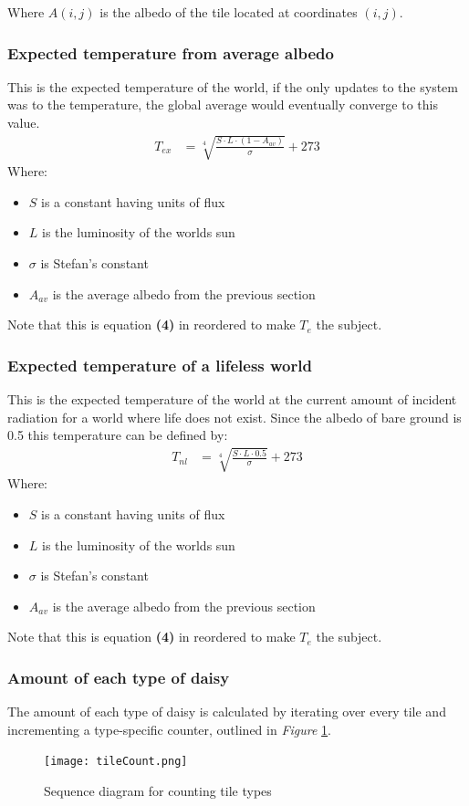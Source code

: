\documentclass[12pt]{article}
\begin{document}
Where $A(i,j)$ is the albedo of the tile located at coordinates
$(i,j)$.

\subsubsection{Expected temperature from average albedo}
This is the expected temperature of the world, if the only updates to
the system was to the temperature, the global average would eventually
converge to this value.
\begin{align}
  T_{ex} &= \sqrt[4]{\frac{S\cdot L \cdot (1-A_{av})}{\sigma}} + 273
\end{align}
Where:
\begin{itemize}
\item $S$ is a constant having units of flux
\item $L$ is the luminosity of the worlds sun
\item $\sigma$ is Stefan's constant
\item $A_{av}$ is the average albedo from the previous section
\end{itemize}

Note that this is equation {\bf (4)} in \cite{watson1983} reordered to
make $T_e$ the subject.

\subsubsection{Expected temperature of a lifeless world}
This is the expected temperature of the world at the current amount of
incident radiation for a world where life does not exist. Since the
albedo of bare ground is 0.5\cite{watson1983} this temperature can be
defined by:
\begin{align}
  T_{nl} &= \sqrt[4]{\frac{S\cdot L  \cdot 0.5}{\sigma}} + 273
\end{align}
Where:
\begin{itemize}
\item $S$ is a constant having units of flux
\item $L$ is the luminosity of the worlds sun
\item $\sigma$ is Stefan's constant
\item $A_{av}$ is the average albedo from the previous section
\end{itemize}

Note that this is equation {\bf (4)} in \cite{watson1983} reordered to
make $T_e$ the subject.


\subsubsection{Amount of each type of daisy}
The amount of each type of daisy is calculated by iterating over every
tile and incrementing a type-specific counter, outlined in \emph{Figure} \ref{fig:tileCount}.
\begin{figure}[h]
  \centering
  \texttt{[image: tileCount.png]}
  \caption{Sequence diagram for counting tile types}
  \label{fig:tileCount}
\end{figure}
\end{document}
